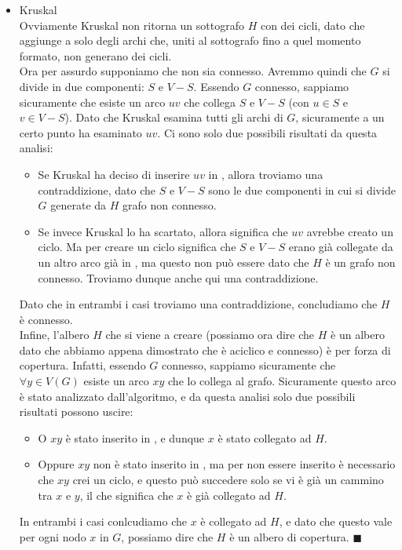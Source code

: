 \documentclass[11pt, a4paper, titlepage, oneside]{scrbook}
\begin{document}
\begin{itemize}
    \item Kruskal \\
    Ovviamente Kruskal non ritorna un sottografo $H$ con dei cicli, dato che aggiunge a  solo degli archi che, uniti al sottografo fino a quel momento formato, non generano dei cicli. \\
    Ora per assurdo supponiamo che non sia connesso. Avremmo quindi che $G$ si divide in due componenti: $S$ e $V - S$. Essendo $G$ connesso, sappiamo sicuramente che esiste un arco $uv$ che collega $S$ e $V - S$ (con $u \in S$ e $v \in V - S$). Dato che Kruskal esamina tutti gli archi di $G$, sicuramente a un certo punto ha esaminato $uv$. Ci sono solo due possibili risultati da questa analisi:
    \begin{itemize}
        \item Se Kruskal ha deciso di inserire $uv$ in , allora troviamo una contraddizione, dato che $S$ e $V-S$ sono le due componenti in cui si divide $G$ generate da $H$ grafo non connesso.
        \item Se invece Kruskal lo ha scartato, allora significa che $uv$ avrebbe creato un ciclo. Ma per creare un ciclo significa che $S$ e $V - S$ erano già collegate da un altro arco già in , ma questo non può essere dato che $H$ è un grafo non connesso. Troviamo dunque anche qui una contraddizione.
    \end{itemize} 
    Dato che in entrambi i casi troviamo una contraddizione, concludiamo che $H$ è connesso. \\
    Infine, l'albero $H$ che si viene a creare (possiamo ora dire che $H$ è un albero dato che abbiamo appena dimostrato che è aciclico e connesso) è per forza di copertura. Infatti, essendo $G$ connesso, sappiamo sicuramente che $\forall y \in V(G)$ esiste un arco $xy$ che lo collega al grafo. Sicuramente questo arco è stato analizzato dall'algoritmo, e da questa analisi solo due possibili risultati possono uscire:
    \begin{itemize}
        \item O $xy$ è stato inserito in , e dunque $x$ è stato collegato ad $H$.
        \item Oppure $xy$ non è stato inserito in , ma per non essere inserito è necessario che $xy$ crei un ciclo, e questo può succedere solo se vi è già un cammino tra $x$ e $y$, il che significa che $x$ è già collegato ad $H$.
    \end{itemize}
    In entrambi i casi conlcudiamo che $x$ è collegato ad $H$, e dato che questo vale per ogni nodo $x$ in $G$, possiamo dire che $H$ è un albero di copertura. $\blacksquare$ 

\end{itemize}
\end{document}
